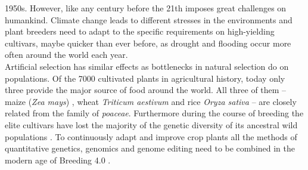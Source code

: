 1950s. However, like any century before the 21th imposes great challenges on
humankind. Climate change leads to different stresses in the environments and plant
breeders need to adapt to the specific requirements on high-yielding cultivars, maybe
quicker than ever before, as drought and flooding occur more often around the world each
year. \\
Artificial selection has similar effects as bottlenecks in natural selection do on
populations.  Of the 7000 cultivated plants in agricultural history, today only three
provide the major source of food around the world. All three of them -- maize (\textit{Zea
  mays}) , wheat \textit{Triticum aestivum} and rice \textit{Oryza sativa} -- are closely
related from the family of \textit{poaceae}. Furthermore during the course of breeding the
elite cultivars have lost the majority of the genetic diversity of its ancestral wild
populations \cite{walsh2018}. To continuously adapt and improve crop plants all the
methods of quantitative genetics, genomics and genome editing need to be combined in the
modern age of Breeding 4.0 \cite{wallace2018road}.
